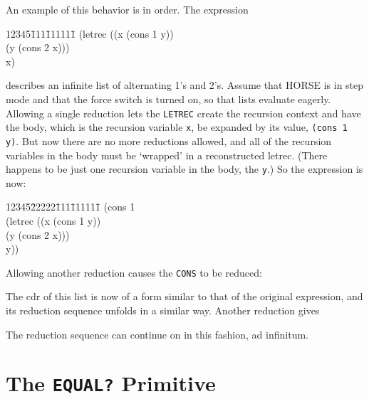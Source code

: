 	An example of this behavior is in order.  The expression
\begin{tt}
\begin{tabbing}
12345\=111\=111111\=\kill
\>(letrec ((x (cons 1 y))\\
\>\>\>	  (y (cons 2 x)))\\
\>\>	x)
\end{tabbing}
\end{tt}
describes an infinite list of alternating 1's and 2's.  Assume that
HORSE is in step mode and that the force switch is turned on, so that lists
evaluate eagerly.  Allowing a single reduction lets the {\tt LETREC}
create the recursion context and have the body, which is the recursion 
variable {\tt x}, be expanded by its value, {\tt (cons 1 y)}.  But now
there are no more reductions allowed, and all of the recursion variables
in the body must be `wrapped' in a reconstructed letrec.  (There happens
to be just one recursion variable in the body, the {\tt y}.)  So the
expression is now:
\pagebreak
\begin{tt}
\begin{tabbing}
12345\=22222\=111\=111111\=\kill
\>(cons 1\\
\>\>(letrec ((x (cons 1 y))\\
\>\>\>\>	  (y (cons 2 x)))\\
\>\>\>	y))
\end{tabbing}
\end{tt}
Allowing another reduction causes the {\tt CONS} to be reduced:
\begin{center}\begin{tt}
\end{tt}\end{center}
The cdr of this list is now of a form similar to that of the original
expression, and its reduction sequence unfolds in a similar way.  Another
reduction gives
\begin{center}\begin{tt}
\end{tt}\end{center}
The reduction sequence can continue on in this fashion, ad infinitum.



\section{The {\tt EQUAL?} Primitive}

